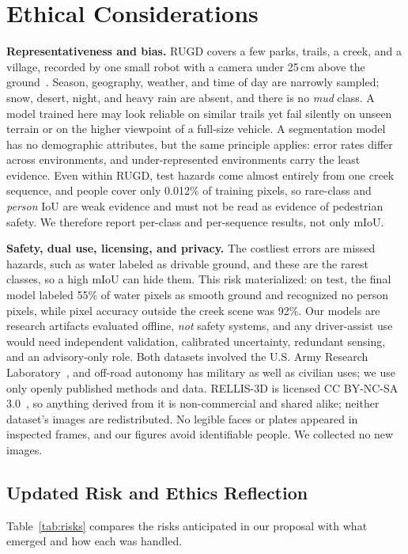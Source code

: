\section{Ethical Considerations}
\label{sec:ethics}

\textbf{Representativeness and bias.} RUGD covers a few parks, trails, a
creek, and a village, recorded by one small robot with a camera under 25\,cm
above the ground~\cite{wigness2019rugd}. Season, geography, weather, and time
of day are narrowly sampled; snow, desert, night, and heavy rain are absent,
and there is no \emph{mud} class. A model trained here may look reliable on
similar trails yet fail silently on unseen terrain or on the higher viewpoint
of a full-size vehicle. A segmentation model has no demographic attributes, but
the same principle applies: error rates differ across environments, and
under-represented environments carry the least evidence. Even within RUGD,
test hazards come almost entirely from one creek sequence, and people cover
only 0.012\% of training pixels, so rare-class and \emph{person} IoU are weak
evidence and must not be read as evidence of pedestrian safety. We therefore
report per-class and per-sequence results, not only mIoU.

\textbf{Safety, dual use, licensing, and privacy.} The costliest errors are
missed hazards, such as water labeled as drivable ground, and these are the
rarest classes, so a high mIoU can hide them. This risk materialized: on test,
the final model labeled 55\% of water pixels as smooth ground and recognized
no person pixels, while pixel accuracy outside the creek scene was 92\%. Our models are research artifacts
evaluated offline, \emph{not} safety systems, and any driver-assist use would
need independent validation, calibrated uncertainty, redundant sensing, and an
advisory-only role. Both datasets involved the U.S. Army Research
Laboratory~\cite{wigness2019rugd,jiang2021rellis}, and off-road autonomy has
military as well as civilian uses; we use only openly published methods and
data. RELLIS-3D is licensed CC BY-NC-SA 3.0~\cite{jiang2021rellis}, so anything
derived from it is non-commercial and shared alike; neither dataset's images
are redistributed. No legible faces or plates appeared in inspected frames,
and our figures avoid identifiable people. We collected no new images.

\subsection{Updated Risk and Ethics Reflection}
\label{sec:reflection}

Table~\ref{tab:risks} compares the risks anticipated in our proposal with
what emerged and how each was handled.


